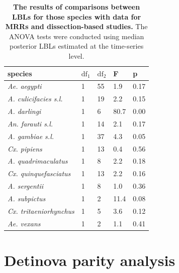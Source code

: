 \documentclass[12pt]{article}
\begin{document}
\begin{table}[htbp]
	\centering
	\begin{tabular}{l|l|l|l|l}
		species & \multicolumn{1}{l}{$\text{df}_1$} & \multicolumn{1}{l}{$\text{df}_2$} & \multicolumn{1}{l}{F} & \multicolumn{1}{l}{p} \\
		\midrule
		\textit{Ae. aegypti} & 1     & 55    & 1.9   & 0.17 \\
		\textit{A. culicifacies s.l.} & 1     & 19    & 2.2   & 0.15 \\
		\textit{A. darlingi} & 1     & 6     & 80.7   & 0.00 \\
		\textit{An. farauti s.l.} & 1     & 14    & 2.1  & 0.17 \\
		\textit{A. gambiae s.l.} & 1     & 37    & 4.3   & 0.05 \\
		\textit{Cx. pipiens} & 1     & 13    & 0.4   & 0.56 \\
		\textit{A. quadrimaculatus} & 1     & 8     & 2.2     & 0.18 \\
		\textit{Cx. quinquefasciatus} & 1     & 13    & 2.2    & 0.16 \\
		\textit{A. sergentii} & 1     & 8     & 1.0    & 0.36 \\
		\textit{A. subpictus} & 1     & 2    & 11.4   & 0.08 \\
		\textit{Cx. tritaeniorhynchus} & 1     & 5     & 3.6   & 0.12 \\
		\textit{Ae. vexans} & 1     & 2     & 1.1   & 0.41 \\
	\end{tabular}%
	\caption{\textbf{The results of comparisons between LBLs for those species with data for MRRs and dissection-based studies.} The ANOVA tests were conducted using median posterior LBLs estimated at the time-series level.}
	\label{tab:comparison}%
\end{table}%

\section{Detinova parity analysis}
\end{document}
